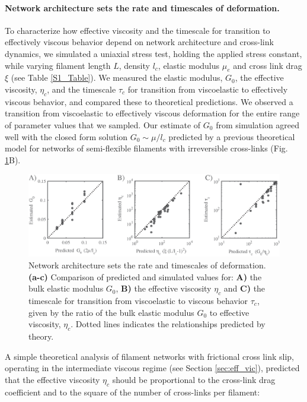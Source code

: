 \paragraph{Network architecture sets the rate and timescales of deformation.}  To characterize how effective viscosity and the timescale for transition to effectively viscous behavior depend on network architecture and cross-link dynamics, we simulated a uniaxial stress test, holding the applied stress constant, while varying filament length $L$, density $l_c$,  elastic modulus $\mu_e$ and cross link drag $\xi$ (see Table \ref{S1_Table}). We measured the elastic modulus, $G_0$, the effective viscosity, $\eta_c$, and the timescale $\tau_c$ for transition from viscoelastic to effectively viscous behavior, and compared these to theoretical predictions. We observed a transition from viscoelastic to effectively viscous deformation for the entire range of parameter values that we sampled.  Our estimate of $G_0$ from simulation agreed well with the closed form solution  $G_0 \sim \mu/l_c$ predicted by a previous theoretical model \cite{theo_hlm} for networks of semi-flexible filaments with irreversible cross-links (Fig. \ref{fig:passive_form}B). 

\begin{figure}[H]
	\centering
	\includegraphics[width=\hsize]{active/figures/Fig3}
	\caption{\label{fig:passive_form} Network architecture sets the rate and timescales of deformation.  \textbf{(a-c)} Comparison of predicted and simulated values for: \textbf{A)} the bulk elastic modulus $G_0$,  \textbf{B)} the effective viscosity $\eta_c$ and \textbf{C)} the timescale for transition from viscoelastic to viscous behavior $\tau_c$, given by the ratio of the bulk elastic modulus $G_0$ to effective viscosity, $\eta_c$. Dotted lines indicates the relationships predicted by theory. }
\end{figure}

A simple theoretical analysis of filament networks with frictional cross link slip, operating in the intermediate viscous regime (see Section \ref{sec:eff_vic}), predicted that the effective viscosity $\eta_c$ should be proportional to the cross-link drag coefficient and to the square of the number of cross-links per filament:

